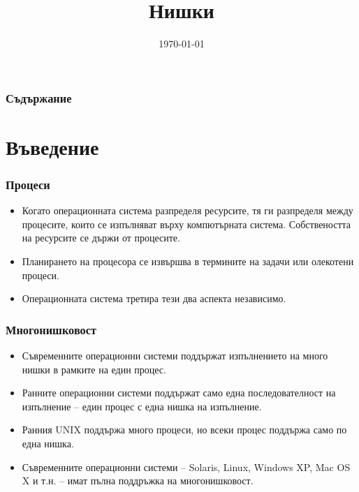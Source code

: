 \documentclass[ignorenonframetext, hyperref=unicode]{beamer}
\title{Нишки}
\date{\today}
\begin{document}
\frame{\maketitle}

\begin{frame}
\frametitle{Съдържание}
\tableofcontents %
\end{frame}

\section{Въведение}


\begin{frame}\frametitle{Процеси}
\begin{itemize}
\item Когато операционната система разпределя ресурсите, тя ги разпределя между
процесите, които се изпълняват върху компютърната система. Собствеността на
ресурсите се държи от процесите.
\item Планирането на процесора се извършва в термините на задачи или олекотени
процеси.
\item Операционната система третира тези два аспекта независимо.
\end{itemize}
\end{frame}

\begin{frame}\frametitle{Многонишковост}
\begin{itemize}
\item Съвременните операционни системи поддържат изпълнението на много нишки в
рамките на един процес.
\item Ранните операционни системи поддържат само една последователност на
изпълнение -- един процес с една нишка на изпълнение.
\item Ранния UNIX поддържа много процеси, но всеки процес поддържа само по една
нишка.
\item Съвременните операционни системи -- Solaris, Linux, Windows XP, Mac OS X и
т.н. -- имат пълна поддръжка на многонишковост.
\end{itemize}
\end{frame}
\end{document}
